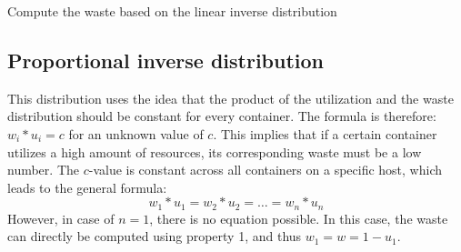 \begin{algorithm}
\caption{Compute the waste based on the linear inverse distribution}\label{alg:linear}
\end{algorithm}

    
\subsection{Proportional inverse distribution} \label{sec:proportional}
This distribution uses the idea that the product of the utilization and the waste distribution should be constant for every container. 
The formula is therefore: $w_i * u_i = c$ for an unknown value of $c$. This implies that if a certain container utilizes a high amount of resources, its corresponding waste must be a low number.
The $c$-value is constant across all containers on a specific host, which leads to the general formula: 
\begin{equation} \label{eq:constant}
    w_1 * u_1 = w_2 * u_2 = \dots = w_n * u_n
\end{equation}
However, in case of $n = 1$, there is no equation possible. In this case, the waste can directly be computed using property 1, and thus $w_1 = w = 1 - u_1$.

